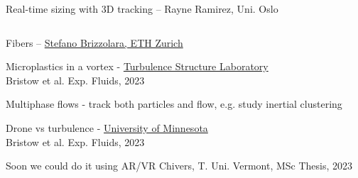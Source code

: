 \begin{frame}[label=app-27]{Real-time sizing with 3D tracking -- Rayne Ramirez, Uni. Oslo}
    \begin{columns}
    \end{columns}
\end{frame}
    
\begin{frame}[label=app-28]{Fibers -- \href{https://www.dropbox.com/s/y5gf55qqeyq5ljr/fibers.mp4?raw=1}{Stefano Brizzolara, ETH Zurich}}
\end{frame}

\begin{frame}[label=app-29]{Microplastics in a vortex - \href{https://www.dropbox.com/s/in5ewv968dy9j3q/microplastics.mp4?raw=1}{Turbulence Structure Laboratory}}
    \\
    Bristow et al. Exp. Fluids, 2023
\end{frame}

    
\begin{frame}[label=app-18a]{Multiphase flows - track both particles and flow, e.g. study inertial clustering}
\end{frame}
    
    
\begin{frame}[label=app-30]{Drone vs turbulence - \href{https://www.dropbox.com/s/3lav5rf6s8su6f5/drone.mp4?raw=1}{University of Minnesota}}
    \\
    Bristow et al. Exp. Fluids, 2023
\end{frame}
    
\begin{frame}[label=app-31]{Soon we could do it using AR/VR}
    Chivers, T. Uni. Vermont, MSc Thesis, 2023
\end{frame}
    
